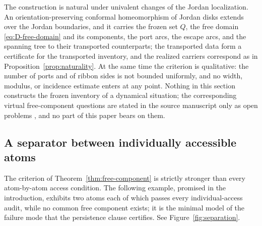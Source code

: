 \documentclass[11pt,reqno]{amsart}
\theoremstyle{definition}
\theoremstyle{remark}
\begin{document}
The construction is natural under univalent changes of the Jordan localization. An
orientation-preserving conformal homeomorphism of Jordan disks extends over the Jordan
boundaries, and it carries the frozen set $Q$, the free domain \eqref{eq:D-free-domain}
and its components, the port arcs, the escape arcs, and the spanning tree to their
transported counterparts; the transported data form a certificate for the transported
inventory, and the realized carriers correspond as in
Proposition~\ref{prop:naturality}. At the same time the criterion is qualitative: the
number of ports and of ribbon sides is not bounded uniformly, and no width, modulus, or
incidence estimate enters at any point. Nothing in this section constructs the frozen
inventory of a dynamical situation; the corresponding virtual free-component questions
are stated in the source manuscript only as open problems \cite{MWman}, and no part of
this paper bears on them.

\subsection{A separator between individually accessible atoms}\label{subsec:D-example}

The criterion of Theorem~\ref{thm:free-component} is strictly stronger than every
atom-by-atom access condition. The following example, promised in the introduction,
exhibits two atoms each of which passes every individual-access audit, while no common
free component exists; it is the minimal model of the failure mode that the persistence
clause certifies. See Figure~\ref{fig:separation}.
\end{document}
